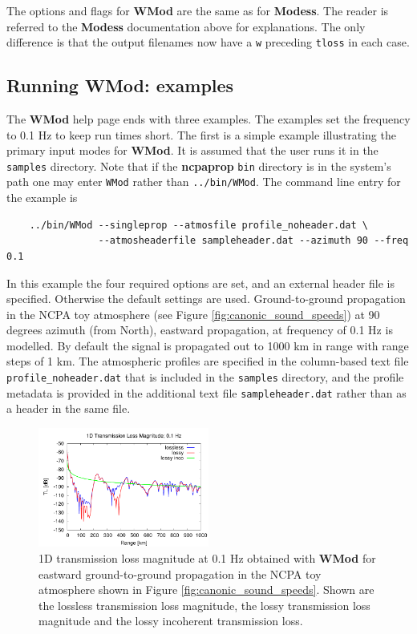 The options and flags for {\bf WMod} are the same as for {\bf Modess}. The reader is referred to the {\bf Modess} documentation above for explanations. The only difference is that the output filenames now have a \verb+w+ preceding \verb+tloss+ in each case. 


\subsection{Running WMod: examples}
\label{sec: wmod examples}

The \textbf{WMod} help page ends with three examples. The examples set the frequency to 0.1 Hz to keep run times short. The first is a simple example illustrating the primary input modes for \textbf{WMod}. It is assumed that the user runs it in the \verb+samples+ directory. Note that if the \textbf{ncpaprop} \verb+bin+ directory is in the system's path one may enter \verb+WMod+ rather than \verb+../bin/WMod+. The command line entry for the example is 
\begin{verbatim} 
    ../bin/WMod --singleprop --atmosfile profile_noheader.dat \ 
                --atmosheaderfile sampleheader.dat --azimuth 90 --freq 0.1
\end{verbatim}
In this example the four required options are set, and an external header file is specified. Otherwise the default settings are used. Ground-to-ground propagation in the NCPA toy atmosphere (see Figure \ref{fig:canonic_sound_speeds}) at 90 degrees azimuth (from North), eastward propagation, at frequency of 0.1 Hz is modelled. By default the signal is propagated out to 1000 km in range with range steps of 1 km. The atmospheric profiles are specified in the column-based text file \verb"profile_noheader.dat" that is included in the \verb+samples+ directory, and the profile metadata is provided in the additional text file \verb"sampleheader.dat" rather than as a header in the same file.

\begin{figure}
\begin{center}
\includegraphics[width=0.5\textwidth]{figs/modess_ex1}
\end{center}
\caption{1D transmission loss magnitude at 0.1 Hz obtained with \textbf{WMod} for eastward ground-to-ground propagation in the NCPA toy atmosphere shown in Figure \ref{fig:canonic_sound_speeds}. Shown are the lossless transmission loss magnitude, the lossy transmission loss magnitude and the lossy incoherent transmission loss.}
\label{fig: wmod 1D tl}
\end{figure}

